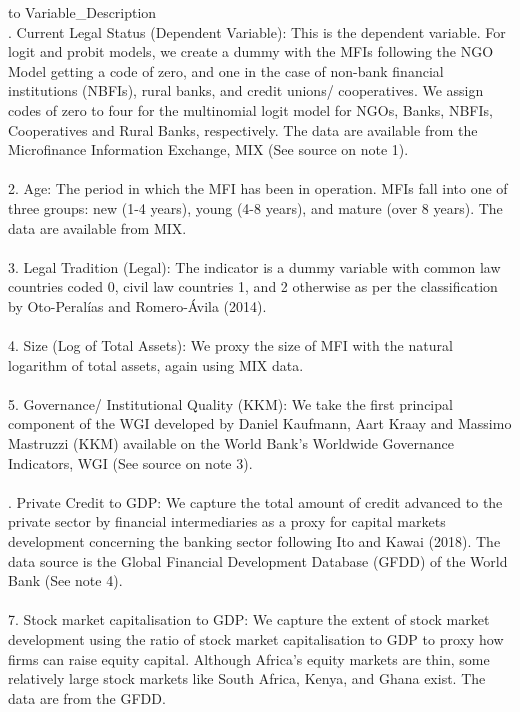 \documentclass[a4paper, nobind]{templates/ociamthesis}
\begin{document}
\begin{landscape}\begin{table}

\caption{\label{tab:unnamed-chunk-24}Description of Variables}
\centering
\fontsize{9}{11}\selectfont
\begin{tabu} to 
\toprule
Variable\_Description\\
. Current Legal Status (Dependent Variable): This is the dependent variable. For logit and probit models, we create a dummy with the MFIs following the NGO Model getting a code of zero, and one in the case of non-bank financial institutions (NBFIs), rural banks, and credit unions/ cooperatives. We assign codes of zero to four for the multinomial logit model for NGOs, Banks, NBFIs, Cooperatives and Rural Banks, respectively. The data are available from the Microfinance Information Exchange, MIX (See source on note 1).\\
\\
2.  Age: The period in which the MFI has been in operation. MFIs fall into one of three groups: new (1-4 years), young (4-8 years), and mature (over 8 years). The data are available from MIX.\\
\\
3. Legal Tradition (Legal): The indicator is a dummy variable with common law countries coded 0, civil law countries 1, and 2 otherwise as per the classification by Oto-Peralías and Romero-Ávila (2014).\\
\addlinespace
\\
4. Size (Log of Total Assets): We proxy the size of MFI with the natural logarithm of total assets, again using MIX data.\\
\\
5. Governance/ Institutional Quality (KKM): We take the first principal component of the WGI developed by Daniel Kaufmann, Aart Kraay and Massimo Mastruzzi (KKM) available on the World Bank's Worldwide Governance Indicators, WGI (See source on note 3).\\
\\
. Private Credit to GDP: We capture the total amount of credit advanced to the private sector by financial intermediaries as a proxy for capital markets development concerning the banking sector following Ito and Kawai (2018). The data source is the Global Financial Development Database (GFDD) of the World Bank (See note 4).\\
\\
7. Stock market capitalisation to GDP: We capture the  extent of stock market development using the ratio of stock market capitalisation to GDP to proxy how firms can raise equity capital. Although Africa's equity markets are thin, some relatively large stock markets like South Africa, Kenya, and Ghana exist. The data are from the GFDD.\\

\end{tabu}
\end{table}
\end{landscape}
\end{document}
